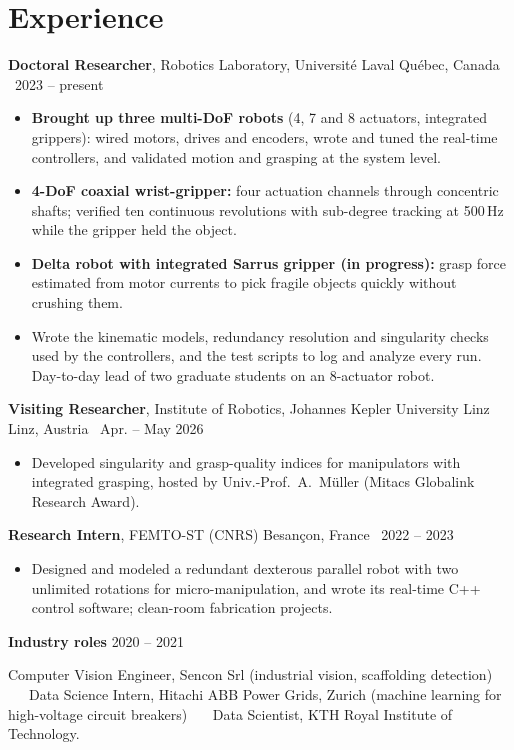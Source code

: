 \documentclass[10pt,letterpaper]{article}
\newcommand{\role}[4]{\textbf{#1}, #2 \hfill {\color{muted}#3 \textbar\ #4}\par}
\begin{document}
\section{Experience}
\role{Doctoral Researcher}{Robotics Laboratory, Universit\'e Laval}{Qu\'ebec, Canada}{2023 -- present}
\begin{itemize}
\item \textbf{Brought up three multi-DoF robots} (4, 7 and 8 actuators, integrated grippers): wired motors, drives and
encoders, wrote and tuned the real-time controllers, and validated motion and grasping at the system level.
\item \textbf{4-DoF coaxial wrist-gripper:} four actuation channels through concentric shafts; verified ten continuous
revolutions with sub-degree tracking at 500\,Hz while the gripper held the object.
\item \textbf{Delta robot with integrated Sarrus gripper (in progress):} grasp force estimated from motor currents to pick
fragile objects quickly without crushing them.
\item Wrote the kinematic models, redundancy resolution and singularity checks used by the controllers, and the test
scripts to log and analyze every run. Day-to-day lead of two graduate students on an 8-actuator robot.
\end{itemize}

\vspace{3pt}
\role{Visiting Researcher}{Institute of Robotics, Johannes Kepler University Linz}{Linz, Austria}{Apr. -- May 2026}
\begin{itemize}
\item Developed singularity and grasp-quality indices for manipulators with integrated grasping, hosted by Univ.-Prof.~A.~M\"uller (Mitacs Globalink Research Award).
\end{itemize}

\vspace{3pt}
\role{Research Intern}{FEMTO-ST (CNRS)}{Besan\c{c}on, France}{2022 -- 2023}
\begin{itemize}
\item Designed and modeled a redundant dexterous parallel robot with two unlimited rotations for micro-manipulation, and wrote its real-time C++ control software; clean-room fabrication projects.
\end{itemize}

\vspace{3pt}
\textbf{Industry roles} \hfill {\color{muted}2020 -- 2021}\par
{\small Computer Vision Engineer, Sencon Srl (industrial vision, scaffolding detection) \ \textbullet\ \ Data Science
Intern, Hitachi ABB Power Grids, Zurich (machine learning for high-voltage circuit breakers) \ \textbullet\ \ Data
Scientist, KTH Royal Institute of Technology.}
\end{document}
